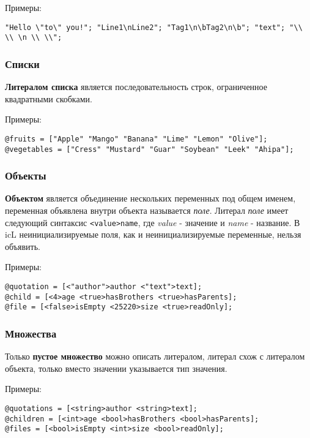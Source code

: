 \documentclass[a4paper, 14pt]{extarticle}
\begin{document}
\noindent Примеры:
\begin{lstlisting}[numbers=none]
"Hello \"to\" you!"; "Line1\nLine2"; "Tag1\n\bTag2\n\b"; "text"; "\\ \\ \n \\ \\";
\end{lstlisting}

\subsubsection{Списки}

	{\bf Литералом списка} является последовательность строк, ограниченное квадратными скобками.

\noindent Примеры:
\begin{lstlisting}[numbers=none]
@fruits = ["Apple" "Mango" "Banana" "Lime" "Lemon" "Olive"];
@vegetables = ["Cress" "Mustard" "Guar" "Soybean" "Leek" "Ahipa"];
\end{lstlisting}

\subsubsection{Объекты}

	{\bf Объектом} является объединение нескольких переменных под общем именем, переменная объявлена внутри объекта называется {\it поле}. Литерал {\it поле} имеет следующий синтаксис \lstinline`<value>name`, где  {\it value} - значение и {\it name} - название. В icL неинициализируемые поля, как и неинициализируемые переменные, нельзя объявить. 
	
\noindent Примеры:
\begin{lstlisting}[numbers=none]
@quotation = [<"author">author <"text">text];
@child = [<4>age <true>hasBrothers <true>hasParents];
@file = [<false>isEmpty <25220>size <true>readOnly];
\end{lstlisting}

\subsubsection{Множества}

	Только {\bf пустое множество} можно описать литералом, литерал схож с литералом объекта, только вместо значении указывается тип значения.
	
\noindent Примеры:
\begin{lstlisting}[numbers=none]
@quotations = [<string>author <string>text];
@children = [<int>age <bool>hasBrothers <bool>hasParents];
@files = [<bool>isEmpty <int>size <bool>readOnly];
\end{lstlisting}
\end{document}
